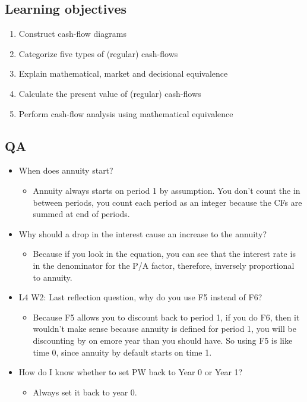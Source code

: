 \subsection{Learning objectives}
\begin{definition}
    \begin{enumerate}
        \item Construct cash-flow diagrams
        \item Categorize five types of (regular) cash-flows
        \item Explain mathematical, market and decisional equivalence
        \item Calculate the present value of (regular) cash-flows
        \item Perform cash-flow analysis using mathematical equivalence
    \end{enumerate}
\end{definition}

\subsection{QA}
\begin{intuition}
    \begin{itemize}
        \item When does annuity start?
        \begin{itemize}
            \item Annuity always starts on period 1 by assumption. You don't count the in between periods, you count each period as an integer because the CFs are summed at end of periods. 
        \end{itemize}
        \item Why should a drop in the interest cause an increase to the annuity?
        \begin{itemize}
            \item Because if you look in the equation, you can see that the interest rate is in the denominator for the P/A factor, therefore, inversely proportional to annuity. 
        \end{itemize}
        \item L4 W2: Last reflection question, why do you use F5 instead of F6? 
        \begin{itemize}
            \item Because F5 allows you to discount back to period 1, if you do F6, then it wouldn't make sense because annuity is defined for period 1, you will be discounting by on emore year than you should have. So using F5 is like time 0, since annuity by default starts on time 1. 
        \end{itemize}
        \item How do I know whether to set PW back to Year 0 or Year 1? 
        \begin{itemize}
            \item Always set it back to year 0.
        \end{itemize}
    \end{itemize}
\end{intuition}

